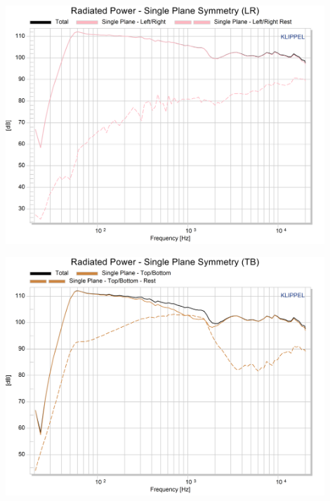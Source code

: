 \documentclass{report}
\begin{document}
\begin{appendices}
\begin{minipage}{0.5\textwidth}
\begin{center}
	\includegraphics[width=0.9\textwidth]{Sym/studio_RadPow_SpsLR}
    \captionsetup{hypcap=false}
    \label{Curves:studio_SpsLR}
\end{center}
\end{minipage}
\begin{minipage}{0.5\textwidth}
\begin{center}
	\includegraphics[width=0.9\textwidth]{Sym/studio_RadPow_SpsTB}
    \captionsetup{hypcap=false}
    \label{Curves:studio_SpsTB}
\end{center}
\end{minipage}


\end{appendices}
\end{document}
